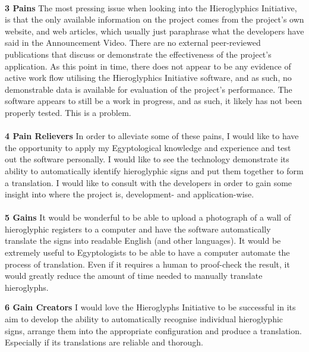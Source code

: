 \documentclass{article}
\begin{document}
\paragraph{} \noindent \break
\textbf{3 Pains}
\newline \break
The most pressing issue when looking into the Hieroglyphics Initiative, is that the only available information on the project comes from the project's own website, and web articles, which usually just paraphrase what the developers have said in the Announcement Video. There are no external peer-reviewed publications that discuss or demonstrate the effectiveness of the project's application.
\newpage \break \noindent
As this point in time, there does not appear to be any evidence of active work flow utilising the Hieroglyphics Initiative software, and as such, no demonstrable data is available for evaluation of the project's performance.
\newline \break
The software appears to still be a work in progress, and as such, it likely has not been properly tested. This is a problem.

\paragraph{} \noindent \break
\textbf{4 Pain Relievers}
\newline \break
In order to alleviate some of these pains, I would like to have the opportunity to apply my Egyptological knowledge and experience and test out the software personally.
\newline \break
I would like to see the technology  demonstrate its ability to automatically identify hieroglyphic signs and put them together to form a translation.
\newline \break
I would like to consult with the developers in order to gain some insight into where the project is, development- and application-wise.

\paragraph{} \noindent \break
\textbf{5 Gains}
\newline \break
It would be wonderful to be able to upload a photograph of a wall of hieroglyphic registers to a computer and have the software automatically translate the signs into readable English (and other languages).
\newline \break
It would be extremely useful to Egyptologists to be able to have a computer automate the process of translation. Even if it requires a human to proof-check the result, it would greatly reduce the amount of time needed to manually translate hieroglyphs.

\newpage \noindent
\textbf{6 Gain Creators}
\newline \break
I would love the Hieroglyphs Initiative to be successful in its aim to develop the ability to automatically recognise individual hieroglyphic signs, arrange them into the appropriate configuration and produce a translation. Especially if its translations are reliable and thorough.
\end{document}
